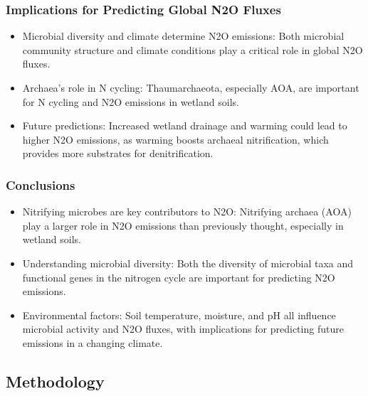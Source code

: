 \documentclass[
]{article}
\providecommand{\tightlist}{%
  \setlength{\itemsep}{0pt}\setlength{\parskip}{0pt}}
\begin{document}
\hypertarget{implications-for-predicting-global-n2o-fluxes}{%
\subsubsection{\texorpdfstring{\textbf{Implications for Predicting
Global N2O
Fluxes}}{Implications for Predicting Global N2O Fluxes}}\label{implications-for-predicting-global-n2o-fluxes}}

\begin{itemize}
\tightlist
\item
  Microbial diversity and climate determine N2O emissions: Both
  microbial community structure and climate conditions play a critical
  role in global N2O fluxes.
\item
  Archaea's role in N cycling: Thaumarchaeota, especially AOA, are
  important for N cycling and N2O emissions in wetland soils.
\item
  Future predictions: Increased wetland drainage and warming could lead
  to higher N2O emissions, as warming boosts archaeal nitrification,
  which provides more substrates for denitrification.
\end{itemize}

\hypertarget{conclusions}{%
\subsubsection{\texorpdfstring{\textbf{Conclusions}}{Conclusions}}\label{conclusions}}

\begin{itemize}
\tightlist
\item
  Nitrifying microbes are key contributors to N2O: Nitrifying archaea
  (AOA) play a larger role in N2O emissions than previously thought,
  especially in wetland soils.
\item
  Understanding microbial diversity: Both the diversity of microbial
  taxa and functional genes in the nitrogen cycle are important for
  predicting N2O emissions.
\item
  Environmental factors: Soil temperature, moisture, and pH all
  influence microbial activity and N2O fluxes, with implications for
  predicting future emissions in a changing climate.
\end{itemize}

\hypertarget{methodology}{%
\subsection{Methodology}\label{methodology}}
\end{document}
